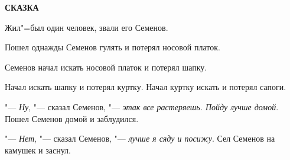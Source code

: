\begin{center}
    \textbf{СКАЗКА}
\end{center}

Жил"=был один человек, звали его Семенов.

Пошел  однажды  Семенов гулять и потерял носовой платок.

Семенов  начал  искать  носовой платок и потерял шапку.

Начал искать шапку и потерял куртку. Начал куртку искать и потерял сапоги.

"--- \textit{Ну}, "--- сказал Семенов, "--- \textit{этак все растеряешь. Пойду лучше домой}. Пошел Семенов домой и заблудился.

"--- \textit{Нет}, "--- сказал Семенов, "---  \textit{лучше я сяду
и посижу}. Сел Семенов на камушек и заснул.